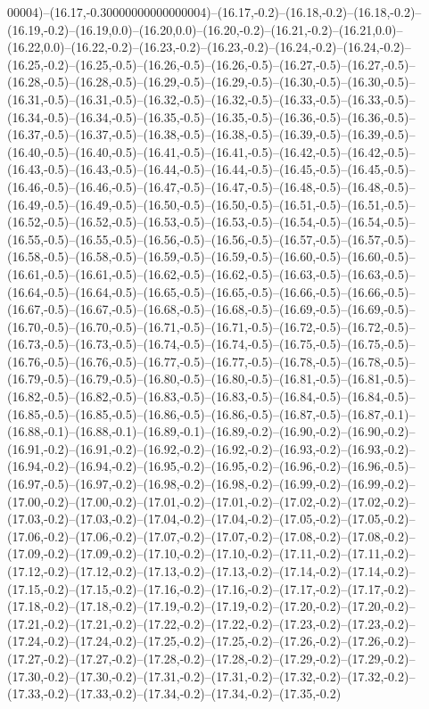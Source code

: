 00004)--(16.17,-0.30000000000000004)--(16.17,-0.2)--(16.18,-0.2)--(16.18,-0.2)--(16.19,-0.2)--(16.19,0.0)--(16.20,0.0)--(16.20,-0.2)--(16.21,-0.2)--(16.21,0.0)--(16.22,0.0)--(16.22,-0.2)--(16.23,-0.2)--(16.23,-0.2)--(16.24,-0.2)--(16.24,-0.2)--(16.25,-0.2)--(16.25,-0.5)--(16.26,-0.5)--(16.26,-0.5)--(16.27,-0.5)--(16.27,-0.5)--(16.28,-0.5)--(16.28,-0.5)--(16.29,-0.5)--(16.29,-0.5)--(16.30,-0.5)--(16.30,-0.5)--(16.31,-0.5)--(16.31,-0.5)--(16.32,-0.5)--(16.32,-0.5)--(16.33,-0.5)--(16.33,-0.5)--(16.34,-0.5)--(16.34,-0.5)--(16.35,-0.5)--(16.35,-0.5)--(16.36,-0.5)--(16.36,-0.5)--(16.37,-0.5)--(16.37,-0.5)--(16.38,-0.5)--(16.38,-0.5)--(16.39,-0.5)--(16.39,-0.5)--(16.40,-0.5)--(16.40,-0.5)--(16.41,-0.5)--(16.41,-0.5)--(16.42,-0.5)--(16.42,-0.5)--(16.43,-0.5)--(16.43,-0.5)--(16.44,-0.5)--(16.44,-0.5)--(16.45,-0.5)--(16.45,-0.5)--(16.46,-0.5)--(16.46,-0.5)--(16.47,-0.5)--(16.47,-0.5)--(16.48,-0.5)--(16.48,-0.5)--(16.49,-0.5)--(16.49,-0.5)--(16.50,-0.5)--(16.50,-0.5)--(16.51,-0.5)--(16.51,-0.5)--(16.52,-0.5)--(16.52,-0.5)--(16.53,-0.5)--(16.53,-0.5)--(16.54,-0.5)--(16.54,-0.5)--(16.55,-0.5)--(16.55,-0.5)--(16.56,-0.5)--(16.56,-0.5)--(16.57,-0.5)--(16.57,-0.5)--(16.58,-0.5)--(16.58,-0.5)--(16.59,-0.5)--(16.59,-0.5)--(16.60,-0.5)--(16.60,-0.5)--(16.61,-0.5)--(16.61,-0.5)--(16.62,-0.5)--(16.62,-0.5)--(16.63,-0.5)--(16.63,-0.5)--(16.64,-0.5)--(16.64,-0.5)--(16.65,-0.5)--(16.65,-0.5)--(16.66,-0.5)--(16.66,-0.5)--(16.67,-0.5)--(16.67,-0.5)--(16.68,-0.5)--(16.68,-0.5)--(16.69,-0.5)--(16.69,-0.5)--(16.70,-0.5)--(16.70,-0.5)--(16.71,-0.5)--(16.71,-0.5)--(16.72,-0.5)--(16.72,-0.5)--(16.73,-0.5)--(16.73,-0.5)--(16.74,-0.5)--(16.74,-0.5)--(16.75,-0.5)--(16.75,-0.5)--(16.76,-0.5)--(16.76,-0.5)--(16.77,-0.5)--(16.77,-0.5)--(16.78,-0.5)--(16.78,-0.5)--(16.79,-0.5)--(16.79,-0.5)--(16.80,-0.5)--(16.80,-0.5)--(16.81,-0.5)--(16.81,-0.5)--(16.82,-0.5)--(16.82,-0.5)--(16.83,-0.5)--(16.83,-0.5)--(16.84,-0.5)--(16.84,-0.5)--(16.85,-0.5)--(16.85,-0.5)--(16.86,-0.5)--(16.86,-0.5)--(16.87,-0.5)--(16.87,-0.1)--(16.88,-0.1)--(16.88,-0.1)--(16.89,-0.1)--(16.89,-0.2)--(16.90,-0.2)--(16.90,-0.2)--(16.91,-0.2)--(16.91,-0.2)--(16.92,-0.2)--(16.92,-0.2)--(16.93,-0.2)--(16.93,-0.2)--(16.94,-0.2)--(16.94,-0.2)--(16.95,-0.2)--(16.95,-0.2)--(16.96,-0.2)--(16.96,-0.5)--(16.97,-0.5)--(16.97,-0.2)--(16.98,-0.2)--(16.98,-0.2)--(16.99,-0.2)--(16.99,-0.2)--(17.00,-0.2)--(17.00,-0.2)--(17.01,-0.2)--(17.01,-0.2)--(17.02,-0.2)--(17.02,-0.2)--(17.03,-0.2)--(17.03,-0.2)--(17.04,-0.2)--(17.04,-0.2)--(17.05,-0.2)--(17.05,-0.2)--(17.06,-0.2)--(17.06,-0.2)--(17.07,-0.2)--(17.07,-0.2)--(17.08,-0.2)--(17.08,-0.2)--(17.09,-0.2)--(17.09,-0.2)--(17.10,-0.2)--(17.10,-0.2)--(17.11,-0.2)--(17.11,-0.2)--(17.12,-0.2)--(17.12,-0.2)--(17.13,-0.2)--(17.13,-0.2)--(17.14,-0.2)--(17.14,-0.2)--(17.15,-0.2)--(17.15,-0.2)--(17.16,-0.2)--(17.16,-0.2)--(17.17,-0.2)--(17.17,-0.2)--(17.18,-0.2)--(17.18,-0.2)--(17.19,-0.2)--(17.19,-0.2)--(17.20,-0.2)--(17.20,-0.2)--(17.21,-0.2)--(17.21,-0.2)--(17.22,-0.2)--(17.22,-0.2)--(17.23,-0.2)--(17.23,-0.2)--(17.24,-0.2)--(17.24,-0.2)--(17.25,-0.2)--(17.25,-0.2)--(17.26,-0.2)--(17.26,-0.2)--(17.27,-0.2)--(17.27,-0.2)--(17.28,-0.2)--(17.28,-0.2)--(17.29,-0.2)--(17.29,-0.2)--(17.30,-0.2)--(17.30,-0.2)--(17.31,-0.2)--(17.31,-0.2)--(17.32,-0.2)--(17.32,-0.2)--(17.33,-0.2)--(17.33,-0.2)--(17.34,-0.2)--(17.34,-0.2)--(17.35,-0.2)